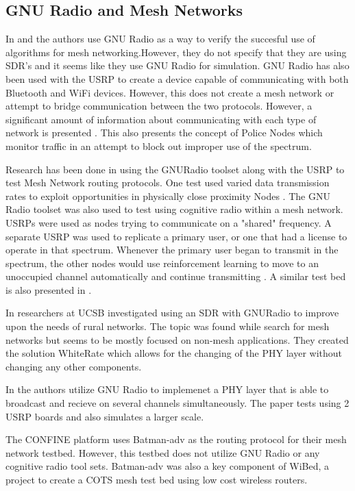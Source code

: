\subsection{GNU Radio and Mesh Networks}

In \cite{4509617} and \cite{5062250} the authors use GNU Radio as a way to verify the succesful use of algorithms for mesh 
networking.However, they do not specify that they are using SDR's and it seems like they use GNU Radio for simulation. GNU Radio has
also been used with the USRP to create a device capable of communicating with both Bluetooth and WiFi devices. However, this does not
create a mesh network or attempt to bridge communication between the two protocols. However, a significant amount of information about
communicating with each type of network is presented \cite{4292880}. This also presents the concept of Police Nodes which monitor
traffic in an attempt to block out improper use of the spectrum. 

Research has been done in using the GNURadio toolset along with the USRP to test Mesh Network routing protocols. One test 
used varied data transmission rates to exploit opportunities in physically close proximity Nodes \cite{5462112}. The GNU Radio 
toolset was also used to test using cognitive radio within a mesh network. USRPs were used as nodes trying to communicate on a
"shared" frequency. A separate USRP was used to replicate a primary user, or one that had a license to operate in that spectrum. 
Whenever the primary user began to transmit in the spectrum, the other nodes would use reinforcement learning to move to an 
unoccupied channel automatically and continue transmitting \cite{7141228}. A similar test bed is also presented in \cite{5508221}.

In \cite{5984947} researchers at UCSB investigated using an SDR with GNURadio to
improve upon the needs of rural networks. The topic was found while search for mesh
networks but seems to be mostly focused on non-mesh applications. They created
the solution WhiteRate which allows for the changing of the PHY layer without 
changing any other components. 

In \cite{5462039} the authors utilize GNU Radio to implemenet a PHY layer that is 
able to broadcast and recieve on several channels simultaneously. The paper
tests using 2 USRP boards and also simulates a larger scale.  

The CONFINE platform uses Batman-adv as the routing protocol for their mesh network testbed. However,
this testbed does not utilize GNU Radio or any cognitive radio tool sets. \cite{0001} Batman-adv 
was also a key component of WiBed, a project to create a COTS mesh test bed using low cost wireless
routers. \cite{6686492} \cite{6962154}

